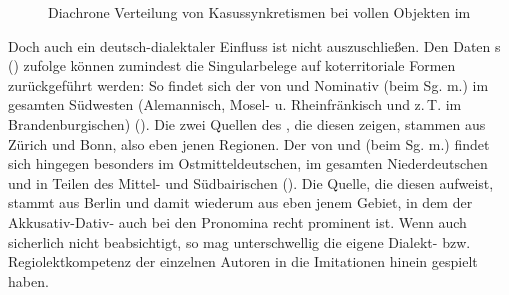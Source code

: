 \begin{figure}[h!]
	\caption{Diachrone Verteilung von Kasussynkretismen bei vollen Objekten im }
	\label{histokasusNP}	
\end{figure}
\FloatBarrier


 
 Doch auch ein deutsch-dialektaler Einfluss ist nicht auszuschließen. Den Daten \citeauthor{Shrier1965}s (\citeyear{Shrier1965}) zufolge können zumindest die Singularbelege auf koterritoriale Formen zurückgeführt werden: So findet sich der  von  und Nominativ (beim Sg. m.) im gesamten Südwesten (Alemannisch, Mosel- u. Rheinfränkisch und z.\,T. im Brandenburgischen) (\cite[423f]{Shrier1965}). Die zwei Quellen des , die diesen  zeigen, stammen aus Zürich und Bonn, also eben jenen Regionen. Der  von  und  (beim Sg. m.) findet sich hingegen besonders im Ostmitteldeutschen, im gesamten Niederdeutschen und in Teilen des Mittel- und Südbairischen (\cite[423f]{Shrier1965}). Die Quelle, die diesen  aufweist, stammt aus Berlin und damit wiederum aus eben jenem Gebiet, in dem der Akkusativ-Dativ- auch bei den Pronomina recht prominent ist. Wenn auch sicherlich nicht beabsichtigt, so mag unterschwellig die eigene Dialekt- bzw. Regiolektkompetenz der einzelnen Autoren in die Imitationen hinein gespielt haben. \\
 

